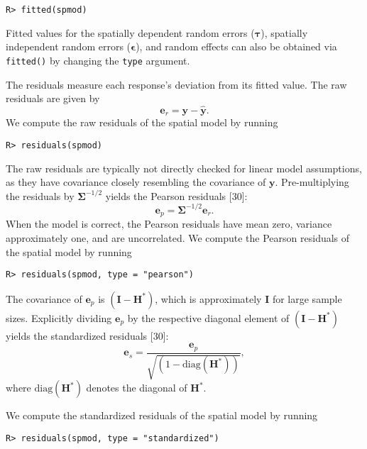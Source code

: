 \documentclass[10pt,letterpaper]{article}
\begin{document}
\begin{verbatim}
R> fitted(spmod)
\end{verbatim}

Fitted values for the spatially dependent random errors
(\(\boldsymbol{\tau}\)), spatially independent random errors
(\(\boldsymbol{\epsilon}\)), and random effects can also be obtained via
\texttt{fitted()} by changing the \texttt{type} argument.

The residuals measure each response's deviation from its fitted value.
The raw residuals are given by \begin{equation*}
  \mathbf{e}_{r} = \mathbf{y} - \hat{\mathbf{y}}.
\end{equation*} We compute the raw residuals of the spatial model by
running

\begin{verbatim}
R> residuals(spmod)
\end{verbatim}

The raw residuals are typically not directly checked for linear model
assumptions, as they have covariance closely resembling the covariance
of \(\mathbf{y}\). Pre-multiplying the residuals by
\(\boldsymbol{\Sigma}^{-1/2}\) yields the Pearson residuals {[}30{]}:
\begin{equation*}
  \mathbf{e}_{p} = \boldsymbol{\Sigma}^{-1/2}\mathbf{e}_{r}.
\end{equation*} When the model is correct, the Pearson residuals have
mean zero, variance approximately one, and are uncorrelated. We compute
the Pearson residuals of the spatial model by running

\begin{verbatim}
R> residuals(spmod, type = "pearson")
\end{verbatim}

The covariance of \(\mathbf{e}_{p}\) is \((\mathbf{I} - \mathbf{H}^*)\),
which is approximately \(\mathbf{I}\) for large sample sizes. Explicitly
dividing \(\mathbf{e}_{p}\) by the respective diagonal element of
\((\mathbf{I} - \mathbf{H}^*)\) yields the standardized residuals
{[}30{]}: \begin{equation*}
  \mathbf{e}_{s} = \frac{\mathbf{e}_{p}}{\sqrt{(1 - \text{diag}(\mathbf{H}^*))}},
\end{equation*} where \(\text{diag}(\mathbf{H}^*)\) denotes the diagonal
of \(\mathbf{H}^*\).

We compute the standardized residuals of the spatial model by running

\begin{verbatim}
R> residuals(spmod, type = "standardized")
\end{verbatim}
\end{document}

